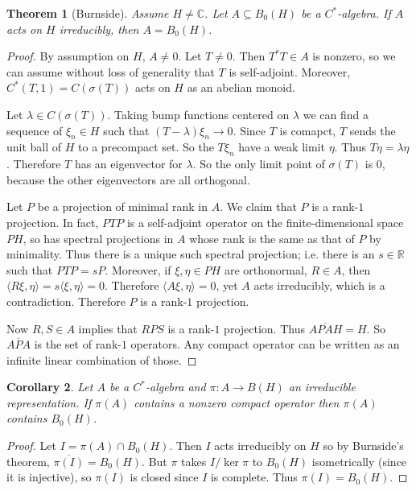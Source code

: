 \documentclass[12pt]{report}
\newcommand{\RR}{\mathbb{R}}
\newcommand{\CC}{\mathbb{C}}
\newtheorem{theorem}{Theorem}[chapter]
\newtheorem{corollary}[theorem]{Corollary}
\theoremstyle{definition}
\begin{document}
\begin{theorem}[Burnside]
    Assume $H \neq \CC$. Let $A \subseteq B_0(H)$ be a $C^*$-algebra. If $A$ acts on $H$ irreducibly, then $A = B_0(H)$.
\end{theorem}
\begin{proof}
    By assumption on $H$, $A \neq 0$. Let $T \neq 0$. Then $T^*T \in A$ is nonzero, so we can assume without loss of generality that $T$ is self-adjoint. Moreover, $C^*(T, 1) = C(\sigma(T))$ acts on $H$ as an abelian monoid.

    Let $\lambda \in C(\sigma(T))$. Taking bump functions centered on $\lambda$ we can find a sequence of $\xi_n \in H$ such that $(T - \lambda)\xi_n \to 0$. Since $T$ is comapct, $T$ sends the unit ball of $H$ to a precompact set. So the $T\xi_n$ have a weak limit $\eta$. Thus $T\eta = \lambda\eta$. Therefore $T$ has an eigenvector for $\lambda$. So the only limit point of $\sigma(T)$ is $0$, because the other eigenvectors are all orthogonal.

    Let $P$ be a projection of minimal rank in $A$. We claim that $P$ is a rank-$1$ projection. In fact, $PTP$ is a self-adjoint operator on the finite-dimensional space $PH$, so has spectral projections in $A$ whose rank is the same as that of $P$ by minimality. Thus there is a unique such spectral projection; i.e. there is an $s \in \RR$ such that $PTP = sP$. Moreover, if $\xi,\eta \in PH$ are orthonormal, $R \in A$, then $\langle R\xi, \eta\rangle = s\langle\xi, \eta\rangle = 0$. Therefore $\langle A\xi, \eta\rangle = 0$, yet $A$ acts irreducibly, which is a contradiction. Therefore $P$ is a rank-$1$ projection.

    Now $R,S \in A$ implies that $RPS$ is a rank-$1$ projection. Thus $\overline{APAH} = H$. So $\overline{APA}$ is the set of rank-$1$ operators. Any compact operator can be written as an infinite linear combination of those.
\end{proof}

\begin{corollary}
    Let $A$ be a $C^*$-algebra and $\pi: A \to B(H)$ an irreducible representation. If $\pi(A)$ contains a nonzero compact operator then $\pi(A)$ contains $B_0(H)$.
\end{corollary}
\begin{proof}
    Let $I = \pi(A) \cap B_0(H)$. Then $I$ acts irreducibly on $H$ so by Burnside's theorem, $\overline{\pi(I)} = B_0(H)$. But $\pi$ takes $I/\ker \pi$ to $B_0(H)$ isometrically (since it is injective), so $\pi(I)$ is closed since $I$ is complete. Thus $\pi(I) = B_0(H)$.
\end{proof}
\end{document}
